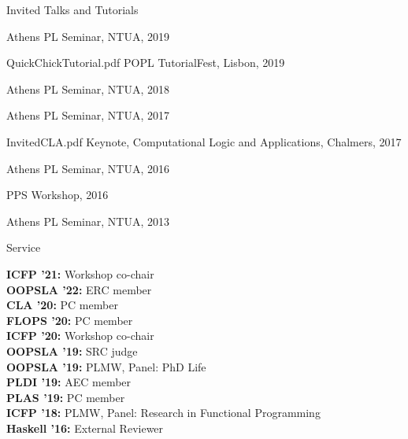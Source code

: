 \documentclass{resume} %
\begin{document}
\begin{rSection}{Invited Talks and Tutorials}

     {}
     {Athens PL Seminar, NTUA, 2019}

    {}
    {}
  
    {QuickChickTutorial.pdf}
    {POPL TutorialFest, Lisbon, 2019}

     {}
     {Athens PL Seminar, NTUA, 2018}

     {}
     {Athens PL Seminar, NTUA, 2017}

     {InvitedCLA.pdf}
     {Keynote, Computational Logic and Applications, Chalmers, 2017}

     {}
     {Athens PL Seminar, NTUA, 2016}

     {}
     {PPS Workshop, 2016}

     {}
     {Athens PL Seminar, NTUA, 2013}
     
\end{rSection}


\newcommand{\serve}[2]{
  {\bf #1:} #2 \\
  }


\begin{rSection}{Service}

  
  \serve{ICFP '21}{Workshop co-chair}
  \serve{OOPSLA '22}{ERC member}
  \serve{CLA '20}{PC member}
  \serve{FLOPS '20}{PC member}
  \serve{ICFP '20}{Workshop co-chair}
  \serve{OOPSLA '19}{SRC judge}
  \serve{OOPSLA '19}{PLMW, Panel: PhD Life}
  \serve{PLDI '19}{AEC member}
  \serve{PLAS '19}{PC member}
  \serve{ICFP '18}{PLMW, Panel: Research in Functional Programming}
  \serve{Haskell '16}{External Reviewer}
  
\end{rSection}


\end{document}

